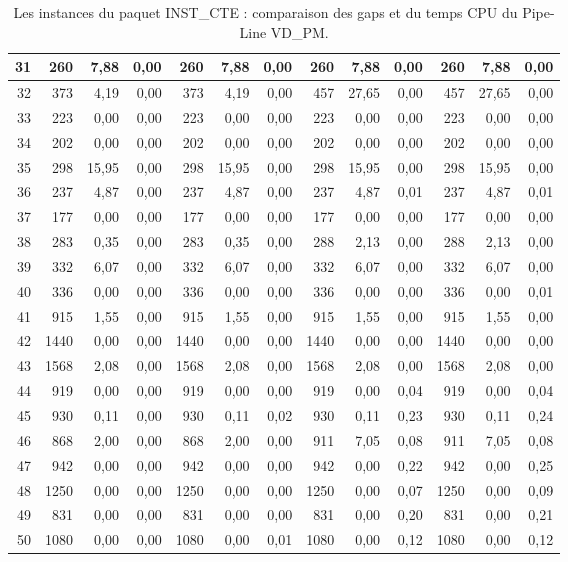 \begin{table}[H]
\begin{tabular}{|r|rrr|rrr|rrr|rrr|}
		31	&	260	&	7,88	&	0,00	&	260	&	7,88	&	0,00	&	260	&	7,88	&	0,00	&	260	&	7,88	&	0,00	\\ \hline
		32	&	373	&	4,19	&	0,00	&	373	&	4,19	&	0,00	&	457	&	27,65	&	0,00	&	457	&	27,65	&	0,00	\\ \hline
		33	&	223	&	0,00	&	0,00	&	223	&	0,00	&	0,00	&	223	&	0,00	&	0,00	&	223	&	0,00	&	0,00	\\ \hline
		34	&	202	&	0,00	&	0,00	&	202	&	0,00	&	0,00	&	202	&	0,00	&	0,00	&	202	&	0,00	&	0,00	\\ \hline
		35	&	298	&	15,95	&	0,00	&	298	&	15,95	&	0,00	&	298	&	15,95	&	0,00	&	298	&	15,95	&	0,00	\\ \hline
		36	&	237	&	4,87	&	0,00	&	237	&	4,87	&	0,00	&	237	&	4,87	&	0,01	&	237	&	4,87	&	0,01	\\ \hline
		37	&	177	&	0,00	&	0,00	&	177	&	0,00	&	0,00	&	177	&	0,00	&	0,00	&	177	&	0,00	&	0,00	\\ \hline
		38	&	283	&	0,35	&	0,00	&	283	&	0,35	&	0,00	&	288	&	2,13	&	0,00	&	288	&	2,13	&	0,00	\\ \hline
		39	&	332	&	6,07	&	0,00	&	332	&	6,07	&	0,00	&	332	&	6,07	&	0,00	&	332	&	6,07	&	0,00	\\ \hline
		40	&	336	&	0,00	&	0,00	&	336	&	0,00	&	0,00	&	336	&	0,00	&	0,00	&	336	&	0,00	&	0,01	\\ \hline
		41	&	915	&	1,55	&	0,00	&	915	&	1,55	&	0,00	&	915	&	1,55	&	0,00	&	915	&	1,55	&	0,00	\\ \hline
		42	&	1440	&	0,00	&	0,00	&	1440	&	0,00	&	0,00	&	1440	&	0,00	&	0,00	&	1440	&	0,00	&	0,00	\\ \hline
		43	&	1568	&	2,08	&	0,00	&	1568	&	2,08	&	0,00	&	1568	&	2,08	&	0,00	&	1568	&	2,08	&	0,00	\\ \hline
		44	&	919	&	0,00	&	0,00	&	919	&	0,00	&	0,00	&	919	&	0,00	&	0,04	&	919	&	0,00	&	0,04	\\ \hline
		45	&	930	&	0,11	&	0,00	&	930	&	0,11	&	0,02	&	930	&	0,11	&	0,23	&	930	&	0,11	&	0,24	\\ \hline
		46	&	868	&	2,00	&	0,00	&	868	&	2,00	&	0,00	&	911	&	7,05	&	0,08	&	911	&	7,05	&	0,08	\\ \hline
		47	&	942	&	0,00	&	0,00	&	942	&	0,00	&	0,00	&	942	&	0,00	&	0,22	&	942	&	0,00	&	0,25	\\ \hline
		48	&	1250	&	0,00	&	0,00	&	1250	&	0,00	&	0,00	&	1250	&	0,00	&	0,07	&	1250	&	0,00	&	0,09	\\ \hline
		49	&	831	&	0,00	&	0,00	&	831	&	0,00	&	0,00	&	831	&	0,00	&	0,20	&	831	&	0,00	&	0,21	\\ \hline
		50	&	1080	&	0,00	&	0,00	&	1080	&	0,00	&	0,01	&	1080	&	0,00	&	0,12	&	1080	&	0,00	&	0,12	\\ \hline
		
		
		\bottomrule
	\end{tabular}%
	\caption{Les instances du paquet INST\_CTE : comparaison des gaps et du temps CPU du Pipe-Line VD\_PM.}
	
	\label{Comparaison_DPS-SMEPC_greed}%
\end{table}%
